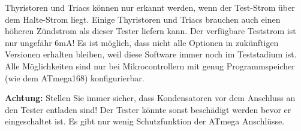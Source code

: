Thyristoren und Triacs k\"onnen nur erkannt werden, wenn der Test-Strom \"uber dem Halte-Strom liegt.
Einige Thyristoren und Triacs brauchen auch einen h\"oheren Z\"undstrom als dieser Tester liefern kann.
Der verf\"ugbare Teststrom ist nur ungef\"ahr 6mA!
Es ist m\"oglich, dass nicht alle Optionen in zuk\"unftigen Versionen erhalten bleiben, weil diese Software
immer noch im Teststadium ist.
Alle M\"oglichkeiten sind nur bei Mikrocontrollern mit genug Programmspeicher (wie dem ATmega168) konfigurierbar.

\vspace{1cm}
\textbf{{\Large Achtung:}} Stellen Sie immer sicher, dass Kondensatoren vor dem Anschluss an den Tester entladen sind!
Der Tester k\"onnte sonst besch\"adigt werden bevor er eingeschaltet ist.
Es gibt nur wenig Schutzfunktion der ATmega Anschl\"usse.


